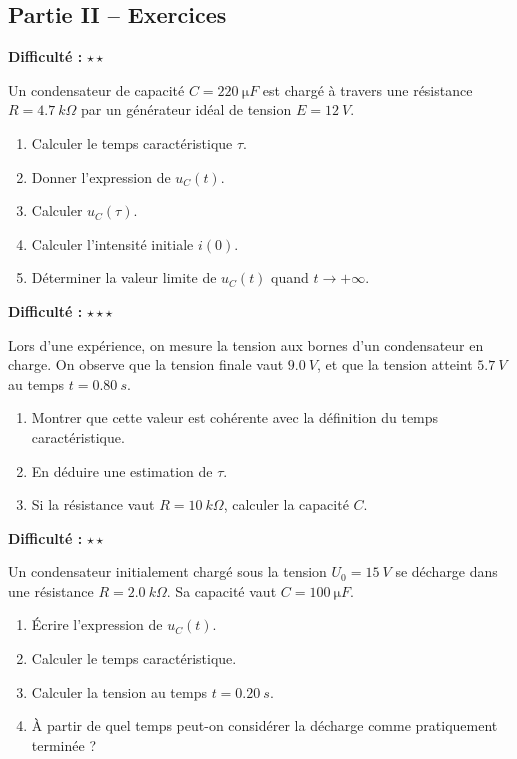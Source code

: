 \documentclass[11pt,a4paper]{article}
\newcommand{\etoiles}[1]{\textbf{Difficulté :} #1}
\begin{document}
\subsection{Partie II -- Exercices}

\begin{exercisebox}
\etoiles{\(\star\star\)}

Un condensateur de capacité \(C=\SI{220}{\micro F}\) est chargé à travers une résistance \(R=\SI{4.7}{k\Omega}\) par un générateur idéal de tension \(E=\SI{12}{V}\).

\begin{enumerate}[label=\alph*)]
    \item Calculer le temps caractéristique \(\tau\).
    \item Donner l'expression de \(u_C(t)\).
    \item Calculer \(u_C(\tau)\).
    \item Calculer l'intensité initiale \(i(0)\).
    \item Déterminer la valeur limite de \(u_C(t)\) quand \(t\to +\infty\).
\end{enumerate}
\end{exercisebox}

\begin{exercisebox}
\etoiles{\(\star\star\star\)}

Lors d'une expérience, on mesure la tension aux bornes d'un condensateur en charge. On observe que la tension finale vaut \(\SI{9.0}{V}\), et que la tension atteint \(\SI{5.7}{V}\) au temps \(t=\SI{0.80}{s}\).

\begin{enumerate}[label=\alph*)]
    \item Montrer que cette valeur est cohérente avec la définition du temps caractéristique.
    \item En déduire une estimation de \(\tau\).
    \item Si la résistance vaut \(R=\SI{10}{k\Omega}\), calculer la capacité \(C\).
\end{enumerate}
\end{exercisebox}

\begin{exercisebox}
\etoiles{\(\star\star\)}

Un condensateur initialement chargé sous la tension \(U_0=\SI{15}{V}\) se décharge dans une résistance \(R=\SI{2.0}{k\Omega}\). Sa capacité vaut \(C=\SI{100}{\micro F}\).

\begin{enumerate}[label=\alph*)]
    \item Écrire l'expression de \(u_C(t)\).
    \item Calculer le temps caractéristique.
    \item Calculer la tension au temps \(t=\SI{0.20}{s}\).
    \item À partir de quel temps peut-on considérer la décharge comme pratiquement terminée ?
\end{enumerate}
\end{exercisebox}
\end{document}
